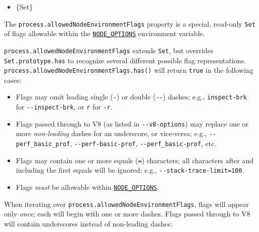 \begin{itemize}
\tightlist
\item
  \{Set\}
\end{itemize}

The \texttt{process.allowedNodeEnvironmentFlags} property is a special,
read-only \texttt{Set} of flags allowable within the
\href{cli.md\#node_optionsoptions}{\texttt{NODE\_OPTIONS}} environment
variable.

\texttt{process.allowedNodeEnvironmentFlags} extends \texttt{Set}, but
overrides \texttt{Set.prototype.has} to recognize several different
possible flag representations.
\texttt{process.allowedNodeEnvironmentFlags.has()} will return
\texttt{true} in the following cases:

\begin{itemize}
\tightlist
\item
  Flags may omit leading single (\texttt{-}) or double (\texttt{-\/-})
  dashes; e.g., \texttt{inspect-brk} for \texttt{-\/-inspect-brk}, or
  \texttt{r} for \texttt{-r}.
\item
  Flags passed through to V8 (as listed in \texttt{-\/-v8-options}) may
  replace one or more \emph{non-leading} dashes for an underscore, or
  vice-versa; e.g., \texttt{-\/-perf\_basic\_prof},
  \texttt{-\/-perf-basic-prof}, \texttt{-\/-perf\_basic-prof}, etc.
\item
  Flags may contain one or more equals (\texttt{=}) characters; all
  characters after and including the first equals will be ignored; e.g.,
  \texttt{-\/-stack-trace-limit=100}.
\item
  Flags \emph{must} be allowable within
  \href{cli.md\#node_optionsoptions}{\texttt{NODE\_OPTIONS}}.
\end{itemize}

When iterating over \texttt{process.allowedNodeEnvironmentFlags}, flags
will appear only \emph{once}; each will begin with one or more dashes.
Flags passed through to V8 will contain underscores instead of
non-leading dashes:

\begin{Shaded}
\begin{Highlighting}[]
 \OperatorTok{;}

\KeywordTok{=\textgreater{}}\NormalTok{ \{}
\NormalTok{\})}\OperatorTok{;}
\end{Highlighting}
\end{Shaded}


